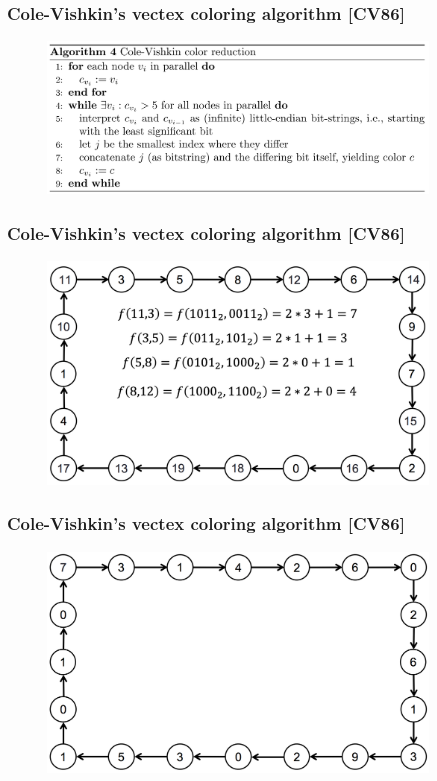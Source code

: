 \begin{frame}
\frametitle{Cole-Vishkin's vectex coloring algorithm [CV86]}
\begin{figure}
    \includegraphics[width=0.9\textwidth]{figures/cole-vishkin.png}
\end{figure}
\end{frame}

\begin{frame}
\frametitle{Cole-Vishkin's vectex coloring algorithm [CV86]}
\begin{figure}
    \includegraphics[width=0.9\textwidth]{figures/cole-vishkin-1.png}
\end{figure}
\end{frame}

\begin{frame}
\frametitle{Cole-Vishkin's vectex coloring algorithm [CV86]}
\begin{figure}
    \includegraphics[width=0.9\textwidth]{figures/cole-vishkin-2.png}
\end{figure}
\end{frame}

